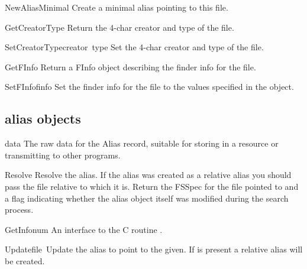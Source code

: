 \begin{funcdesc}{NewAliasMinimal}{}
Create a minimal alias pointing to this file.
\end{funcdesc}

\begin{funcdesc}{GetCreatorType}{}
Return the 4-char creator and type of the file.
\end{funcdesc}

\begin{funcdesc}{SetCreatorType}{creator\, type}
Set the 4-char creator and type of the file.
\end{funcdesc}

\begin{funcdesc}{GetFInfo}{}
Return a FInfo object describing the finder info for the file.
\end{funcdesc}

\begin{funcdesc}{SetFInfo}{finfo}
Set the finder info for the file to the values specified in the
 object.
\end{funcdesc}

\subsection{alias objects}

\renewcommand{\indexsubitem}{(alias object attribute)}
\begin{datadesc}{data}
The raw data for the Alias record, suitable for storing in a resource
or transmitting to other programs.
\end{datadesc}

\renewcommand{\indexsubitem}{(alias object method)}
\begin{funcdesc}{Resolve}{}
Resolve the alias. If the alias was created as a relative alias you
should pass the file relative to which it is. Return the FSSpec for
the file pointed to and a flag indicating whether the alias object
itself was modified during the search process. 
\end{funcdesc}

\begin{funcdesc}{GetInfo}{num}
An interface to the C routine .
\end{funcdesc}

\begin{funcdesc}{Update}{file\, }
Update the alias to point to the  given. If  is
present a relative alias will be created.
\end{funcdesc}

